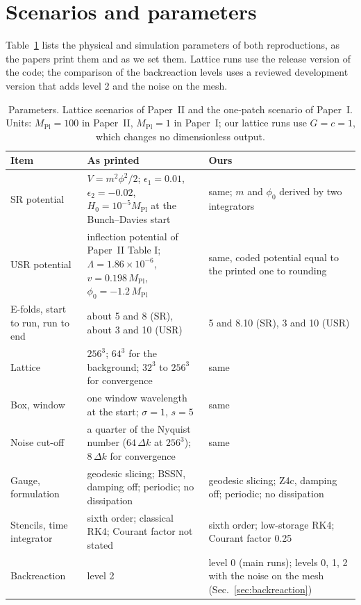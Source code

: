\documentclass[aps,prd,twocolumn,10pt,superscriptaddress,nofootinbib,longbibliography,floatfix]{revtex4-2}
\newcommand{\Mpl}{M_\mathrm{Pl}}
\newcommand{\Pone}{Paper~I}
\newcommand{\Ptwo}{Paper~II}
\begin{document}
\section{Scenarios and parameters}\label{app:params}

Table~\ref{tab:params} lists the physical and simulation parameters of both reproductions, as the papers print them and as we set them. Lattice runs use the release version of the code; the comparison of the backreaction levels uses a reviewed development version that adds level 2 and the noise on the mesh.

\begin{table}
\caption{Parameters. Lattice scenarios of \Ptwo{} and the one-patch scenario of \Pone{}. Units: $\Mpl = 100$ in \Ptwo{}, $\Mpl = 1$ in \Pone{}; our lattice runs use $G = c = 1$, which changes no dimensionless output.}
\label{tab:params}
\footnotesize
\begin{tabular}{p{}p{}p{}}
\toprule
Item & As printed & Ours \\
\midrule
SR potential & $V = m^2\phi^2/2$; $\epsilon_1 = 0.01$, $\epsilon_2 = -0.02$, $H_0 = 10^{-5}\Mpl$ at the Bunch--Davies start & same; $m$ and $\phi_0$ derived by two integrators \\
USR potential & inflection potential of \Ptwo{} Table I; $\Lambda = 1.86\times10^{-6}$, $v = 0.198\,\Mpl$, $\phi_0 = -1.2\,\Mpl$ & same, coded potential equal to the printed one to rounding \\
E-folds, start to run, run to end & about 5 and 8 (SR), about 3 and 10 (USR) & 5 and 8.10 (SR), 3 and 10 (USR) \\
Lattice & $256^3$; $64^3$ for the background; $32^3$ to $256^3$ for convergence & same \\
Box, window & one window wavelength at the start; $\sigma = 1$, $s = 5$ & same \\
Noise cut-off & a quarter of the Nyquist number ($64\,\Delta k$ at $256^3$); $8\,\Delta k$ for convergence & same \\
Gauge, formulation & geodesic slicing; BSSN, damping off; periodic; no dissipation & geodesic slicing; Z4c, damping off; periodic; no dissipation \\
Stencils, time integrator & sixth order; classical RK4; Courant factor not stated & sixth order; low-storage RK4; Courant factor 0.25 \\
Backreaction & level 2 & level 0 (main runs); levels 0, 1, 2 with the noise on the mesh (Sec.~\ref{sec:backreaction}) \\

\end{tabular}
\end{table}
\end{document}
